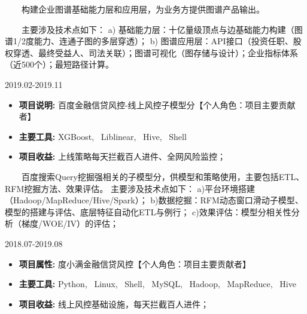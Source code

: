 \documentclass{resume}
\begin{document}
{\begin{itemize}  [parsep=0.5ex]
\end{itemize}


{    \ \ \ \ 构建企业图谱基础能力层和应用层，为业务方提供图谱产品输出。

\ \ \ \ 主要涉及技术点如下：
a) 基础能力层：十亿量级顶点与边基础能力构建（图谱1/2度能力、连通子图的多层穿透）；
b) 图谱应用层：API接口（投资任职、股权穿透、最终受益人、司法关联）；图谱可视化（图存储与设计）；企业指标体系（近500个）；最短路径计算。 }

\medskip















                      {2019.02-2019.11}

\begin{itemize}  [parsep=0.5ex]

  \item   \textbf{  项目说明:  }   {  百度金融信贷风控-线上风控子模型分【个人角色：项目主要贡献者】  }                
  \item   \textbf{  主要工具:  }   {  XGBoost, \ Liblinear, \ Hive, \ Shell  }
  \item   \textbf{  项目收益:  }   {  上线策略每天拦截百人进件、全网风险监控；  }

\end{itemize}


{    \ \ \ \ 百度搜索Query挖掘强相关的子模型分，供模型和策略使用，主要包括ETL、RFM挖掘方法、效果评估。
主要涉及技术点如下：
a)平台环境搭建（Hadoop/MapReduce/Hive/Spark）；
b)数据挖掘：RFM动态窗口滑动子模型、模型的搭建与评估、底层特征自动化ETL与例行；
c)效果评估：模型分相关性分析（梯度/WOE/IV）的评估；
}

\medskip










                             {2018.07-2019.08}

\begin{itemize} [parsep=0.5ex]

  \item   \textbf{  项目属性:  }  {  度小满金融信贷风控【个人角色：项目主要贡献者】  }
  \item   \textbf{  主要工具:  }  {  Python, \ Linux, \ Shell, \ MySQL, \ Hadoop, \ MapReduce, \ Hive }
  \item   \textbf{  项目收益:  }  {  线上风控基础设施，每天拦截百人进件； }


\end{itemize}}
\end{document}
